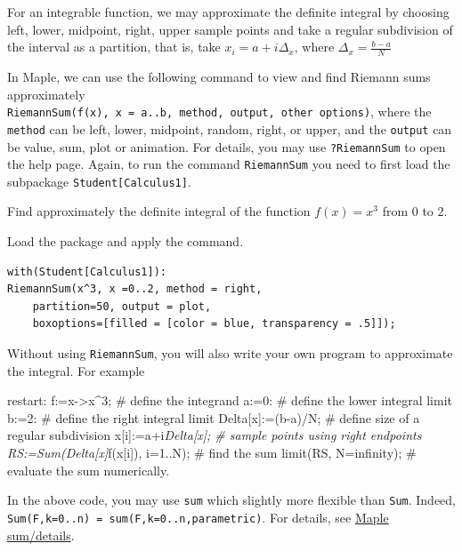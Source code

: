 \documentclass[]{book}
\theoremstyle{definition}
\theoremstyle{definition}
\theoremstyle{definition}
\theoremstyle{remark}
\let\BeginKnitrBlock\begin \let\EndKnitrBlock\end
\begin{document}
For an integrable function, we may approximate the definite integral by choosing left, lower, midpoint, right, upper sample points and take a regular subdivision of the interval as a partition, that is, take \(x_i=a+i\Delta_x\), where \(\Delta_x=\frac{b-a}{N}\)

In Maple, we can use the following command to view and find Riemann sums approximately
\texttt{RiemannSum(f(x),\ x\ =\ a..b,\ method,\ output,\ other\ options)}, where the \texttt{method} can be left, lower, midpoint, random, right, or upper, and the \texttt{output} can be value, sum, plot or animation. For details, you may use \texttt{?RiemannSum} to open the help page.
Again, to run the command \texttt{RiemannSum} you need to first load the subpackage \texttt{Student{[}Calculus1{]}}.

\BeginKnitrBlock{example}
\protect\hypertarget{exm:unnamed-chunk-131}{}{\label{exm:unnamed-chunk-131} }
Find approximately the definite integral of the function \(f(x)=x^3\) from \(0\) to \(2\).
\EndKnitrBlock{example}

\BeginKnitrBlock{solution}
{}
Load the package and apply the command.

\begin{verbatim}
with(Student[Calculus1]):
RiemannSum(x^3, x =0..2, method = right,
    partition=50, output = plot,
    boxoptions=[filled = [color = blue, transparency = .5]]);
\end{verbatim}
\EndKnitrBlock{solution}

Without using \texttt{RiemannSum}, you will also write your own program to approximate the integral. For example

\BeginKnitrBlock{solution}[Another solution]
{}
restart:
f:=x-\textgreater x\^{}3; \# define the integrand
a:=0: \# define the lower integral limit
b:=2: \# define the right integral limit
Delta{[}x{]}:=(b-a)/N; \# define size of a regular subdivision
x{[}i{]}:=a+i\emph{Delta{[}x{]}; \# sample points using right endpoints
RS:=Sum(Delta{[}x{]}}f(x{[}i{]}), i=1..N); \# find the sum
limit(RS, N=infinity); \# evaluate the sum numerically.
\EndKnitrBlock{solution}

\BeginKnitrBlock{remark}
{}
In the above code, you may use \texttt{sum} which slightly more flexible than \texttt{Sum}. Indeed, \texttt{Sum(F,k=0..n)\ =\ sum(F,k=0..n,parametric)}. For details, see \href{https://www.maplesoft.com/support/help/Maple/view.aspx?path=sum/details}{Maple sum/details}.
\EndKnitrBlock{remark}
\end{document}
